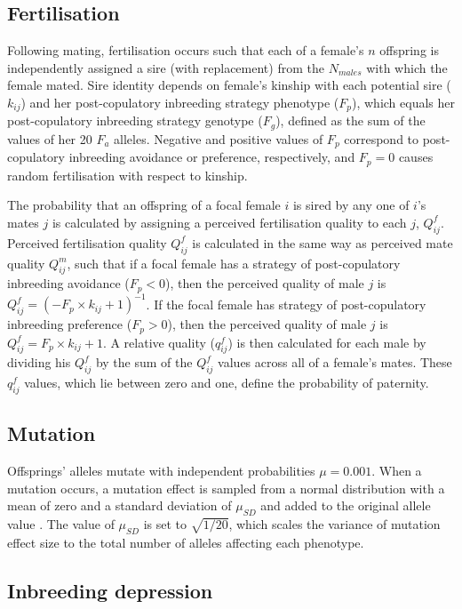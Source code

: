 \documentclass[10pt,letterpaper]{article}
\begin{document}
\subsection*{Fertilisation}

Following mating, fertilisation occurs such that each of a female's $n$ offspring is independently assigned a sire (with replacement) from the $N_{males}$ with which the female mated. Sire identity depends on female's kinship with each potential sire ($k_{ij}$) and her post-copulatory inbreeding strategy phenotype ($F_{p}$), which equals her post-copulatory inbreeding strategy genotype ($F_{g}$), defined as the sum of the values of her 20 $F_{a}$ alleles. Negative and positive values of $F_{p}$ correspond to post-copulatory inbreeding avoidance or preference, respectively, and $F_{p}=0$ causes random fertilisation with respect to kinship. 

The probability that an offspring of a focal female $i$ is sired by any one of $i$'s mates $j$ is calculated by assigning a perceived fertilisation quality to each $j$, $Q^{f}_{ij}$. Perceived fertilisation quality $Q^{f}_{ij}$ is calculated in the same way as perceived mate quality $Q^{m}_{ij}$, such that if a focal female has a strategy of post-copulatory inbreeding avoidance ($F_{p}<0$), then the perceived quality of male $j$ is $Q^{f}_{ij} = (-F_{p} \times k_{ij} + 1)^{-1}$. If the focal female has strategy of post-copulatory inbreeding preference ($F_{p}>0$), then the perceived quality of male $j$ is $Q^{f}_{ij} = F_{p} \times k_{ij} + 1$. A relative quality ($q^{f}_{ij}$) is then calculated for each male by dividing his $Q^{f}_{ij}$ by the sum of the $Q^{f}_{ij}$ values across all of a female's mates. These $q^{f}_{ij}$ values, which lie between zero and one, define the probability of paternity.

\subsection*{Mutation}

Offsprings' alleles mutate with independent probabilities $\mu=0.001$. When a mutation occurs, a mutation effect is sampled from a normal distribution with a mean of zero and a standard deviation of $\mu_{SD}$ and added to the original allele value \cite[][]{Kimura1965, Lande1976, Bocedi2014, Duthie}. The value of $\mu_{SD}$ is set to $\sqrt{1/20}$, which scales the variance of mutation effect size to the total number of alleles affecting each phenotype.

\subsection*{Inbreeding depression}
\end{document}
